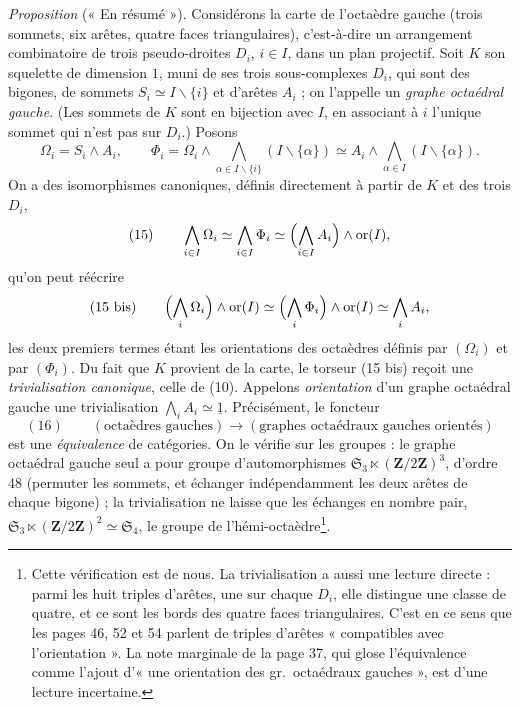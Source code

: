 \documentclass[11pt,a4paper]{article}
\begin{document}
\emph{Proposition} (« En résumé »). Considérons la carte de l'octaèdre gauche
(trois sommets, six arêtes, quatre faces triangulaires), c'est-à-dire
un arrangement combinatoire de trois pseudo-droites $D_i$, $i \in I$, dans un
plan projectif. Soit $K$ son squelette de dimension $1$, muni de ses trois
sous-complexes $D_i$, qui sont des bigones, de sommets $S_i \simeq I
\smallsetminus \{i\}$ et d'arêtes $A_i$ ; on l'appelle un \emph{graphe
octaédral gauche}. (Les sommets de $K$ sont en bijection avec $I$, en
associant à $i$ l'unique sommet qui n'est pas sur $D_i$.) Posons
\[
\Omega_i = S_i \wedge A_i, \qquad \Phi_i = \Omega_i \wedge \bigwedge_{\alpha
\in I \smallsetminus \{i\}} (I \smallsetminus \{\alpha\}) \simeq A_i \wedge
\bigwedge_{\alpha \in I} (I \smallsetminus \{\alpha\}).
\]
On a des isomorphismes canoniques, définis directement à partir de $K$ et
des trois $D_i$,
\[
(15) \qquad \bigwedge_{i \in I} \Omega_i \simeq \bigwedge_{i \in I} \Phi_i
\simeq \Bigl(\bigwedge_{i \in I} A_i\Bigr) \wedge \mathrm{or}(I),
\]
qu'on peut réécrire
\[
(15\ \text{bis}) \qquad \Bigl(\bigwedge_{i} \Omega_i\Bigr) \wedge \mathrm{or}(I)
\simeq \Bigl(\bigwedge_{i} \Phi_i\Bigr) \wedge \mathrm{or}(I) \simeq
\bigwedge_{i} A_i ,
\]
les deux premiers termes étant les orientations des octaèdres définis par
$(\Omega_i)$ et par $(\Phi_i)$. Du fait que $K$ provient de la carte, le
torseur (15 bis) reçoit une \emph{trivialisation canonique}, celle de (10).
Appelons \emph{orientation} d'un graphe octaédral gauche une trivialisation
$\bigwedge_{i} A_i \simeq \underline{1}$. Précisément, le foncteur
\[
(16) \qquad (\text{octaèdres gauches}) \longrightarrow (\text{graphes
octaédraux gauches orientés})
\]
est une \emph{équivalence} de catégories. On le vérifie sur les groupes : le
graphe octaédral gauche seul a pour groupe d'automorphismes
$\mathfrak{S}_3 \ltimes (\mathbf{Z}/2\mathbf{Z})^3$, d'ordre $48$ (permuter les
sommets, et échanger indépendamment les deux arêtes de chaque bigone) ; la
trivialisation ne laisse que les échanges en nombre pair, $\mathfrak{S}_3
\ltimes (\mathbf{Z}/2\mathbf{Z})^2 \simeq \mathfrak{S}_4$, le groupe de
l'hémi-octaèdre\footnote{Cette vérification est de nous. La
trivialisation a aussi une lecture directe : parmi les huit triples
d'arêtes, une sur chaque $D_i$, elle distingue une classe de quatre, et ce
sont les bords des quatre faces triangulaires. C'est en ce sens que les
pages 46, 52 et 54 parlent de triples d'arêtes « compatibles avec
l'orientation ». La note marginale de la page 37, qui glose l'équivalence
comme l'ajout d'« une orientation des gr.\ octaédraux gauches », est d'une
lecture incertaine.}. 
\end{document}
